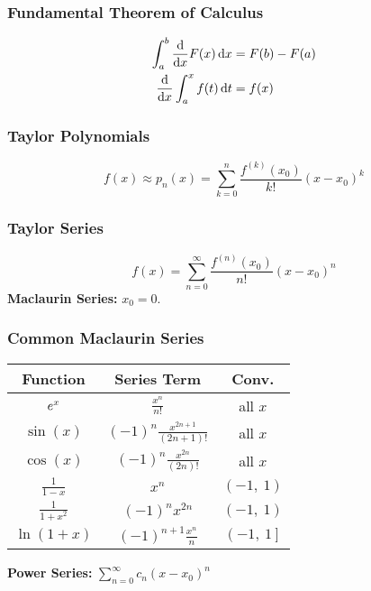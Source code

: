 \documentclass{article}
\begin{document}
\begin{multicols}{3}
    \subsubsection*{Fundamental Theorem of Calculus}
    \begin{align*}
        \int_a^b \dv{x}F(x) \dd{x} & = F(b) - F(a) \\
        \dv{x}\int_a^x f(t) \dd{t} & = f(x)
    \end{align*}
    \subsubsection*{Taylor Polynomials}
    \begin{equation*}
        f(x) \approx p_n(x) = \sum_{k=0}^n \frac{f^{\left( k \right)}(x_0)}{k!} \left( x-x_0 \right)^k
    \end{equation*}
    \subsubsection*{Taylor Series}
    \begin{equation*}
        f(x) = \sum_{n=0}^{\infty} \frac{f^{\left( n \right)}(x_0)}{n!}\left( x-x_0 \right)^n
    \end{equation*}
    \textbf{Maclaurin Series:} $x_0 = 0$.
    \subsubsection*{Common Maclaurin Series}
    \begin{table}[H]
        \centering
        \begin{tabular}{c | c | c}
            \toprule
            \textbf{Function}         & \textbf{Series Term}                                        & \textbf{Conv.}           \\
            \midrule
            $e^{x}$                  & $\frac{x^n}{n!}$                                            & all $x$                  \\
            $\sin{\left( x \right)}$  & $\left( -1 \right)^n \frac{x^{2n+1}}{\left( 2n+1 \right)!}$ & all $x$                  \\
            $\cos{\left( x \right)}$  & $\left( -1 \right)^n \frac{x^{2n}}{\left( 2n \right)!}$     & all $x$                  \\
            $\frac{1}{1-x}$           & $x^n$                                                       & $\left( -1,\: 1 \right)$ \\
            $\frac{1}{1+x^2}$         & $\left( -1 \right)^n x^{2n}$                                & $\left( -1,\: 1 \right)$ \\
            $\ln{\left( 1+x \right)}$ & $\left( -1 \right)^{n+1} \frac{x^n}{n}$                     & $\left( -1,\: 1 \right]$ \\
            \bottomrule
        \end{tabular}
    \end{table}
    \textbf{Power Series:} $\sum_{n=0}^{\infty} c_n\left( x-x_0 \right)^n$

\end{multicols}
\end{document}
